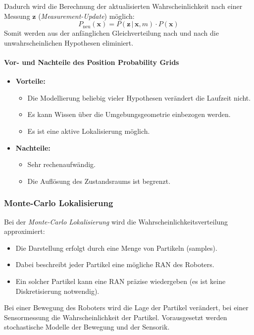 \documentclass[a4paper, 11pt, accentcolor = tud3b]{tudreport}
\newcommand{\given}{\,\vert\,}
\renewcommand{\vec}[1]{\boldsymbol{#1}}
\begin{document}
						Dadurch wird die Berechnung der aktualisierten Wahrscheinlichkeit nach einer Messung \( \vec{z} \) (\emph{Measurement-Update}) möglich:
						\begin{equation*}
							P_\text{neu}(\vec{x}) = P(\vec{z} \given \vec{x}, m) \cdot P(\vec{x})
						\end{equation*}
						Somit werden aus der anfänglichen Gleichverteilung nach und nach die unwahrscheinlichen Hypothesen eliminiert.
					
					\paragraph{Vor- und Nachteile des Position Probability Grids}
						\begin{itemize}
							\item \textbf{Vorteile:}
								\begin{itemize}
									\item Die Modellierung beliebig vieler Hypothesen verändert die Laufzeit nicht.
									\item Es kann Wissen über die Umgebungsgeometrie einbezogen werden.
									\item Es ist eine aktive Lokalisierung möglich.
								\end{itemize}
							\item \textbf{Nachteile:}
								\begin{itemize}
									\item Sehr rechenaufwändig.
									\item Die Auflösung des Zustandsraums ist begrenzt.
								\end{itemize}
						\end{itemize}

				\subsubsection{Monte-Carlo Lokalisierung}
					Bei der \emph{Monte-Carlo Lokalisierung} wird die Wahrscheinlichkeitsverteilung approximiert:
					\begin{itemize}
						\item Die Darstellung erfolgt durch eine Menge von Partikeln (samples).
						\item Dabei beschreibt jeder Partikel eine mögliche RAN des Roboters.
						\item Ein solcher Partikel kann eine RAN präzise wiedergeben (es ist keine Diskretisierung notwendig).
					\end{itemize}
					Bei einer Bewegung des Roboters wird die Lage der Partikel verändert, bei einer Sensormessung die Wahrscheinlichkeit der Partikel. Vorausgesetzt werden stochastische Modelle der Bewegung und der Sensorik.
					
\end{document}

